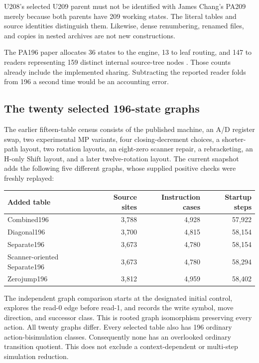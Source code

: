 \documentclass[11pt,letterpaper]{article}
\begin{document}
U208's selected U209 parent must not be identified with James Chang's
PA209 merely because both parents have 209 working states. The literal
tables and source identities distinguish them. Likewise, dense
renumbering, renamed files, and copies in nested archives are not new
constructions.

The PA196 paper allocates 36 states to the engine, 13 to leaf routing,
and 147 to readers representing 159 distinct internal source-tree nodes
\cite{pa196}. Those counts already include the implemented sharing.
Subtracting the reported reader folds from 196 a second time would be an
accounting error.

\subsection{The twenty selected 196-state graphs}

The earlier fifteen-table census consists of the published machine,
an A/D register swap, two experimental MP variants, four closing-decrement
choices, a shorter-path layout, two rotation layouts, an eight-zero
scanner repair, a rebracketing, an H-only Shift layout, and a later
twelve-rotation layout. The current snapshot adds the following five
different graphs, whose supplied positive checks were freshly replayed:

\begin{center}\small
\begin{tabular}{@{}lrrr@{}}
\toprule
Added table & Source sites & Instruction cases & Startup steps\\
\midrule
Combined196 & 3,788 & 4,928 & 57,922\\
Diagonal196 & 3,700 & 4,815 & 58,154\\
Separate196 & 3,673 & 4,780 & 58,154\\
Scanner-oriented Separate196 & 3,673 & 4,780 & 58,294\\
Zerojump196 & 3,812 & 4,959 & 58,402\\
\bottomrule
\end{tabular}
\end{center}

The independent graph comparison starts at the designated initial control,
explores the read-0 edge before read-1, and records the write symbol, move
direction, and successor class. This is rooted graph isomorphism preserving
every action. All twenty graphs differ. Every selected table also has
196 ordinary action-bisimulation classes. Consequently none has an
overlooked ordinary transition quotient. This does not exclude a
context-dependent or multi-step simulation reduction.
\end{document}
